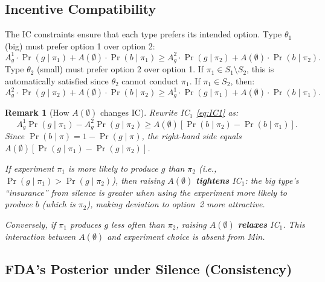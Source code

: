 \documentclass[12pt,a4paper]{article}
\newtheorem{remark}{Remark}
\begin{document}
\subsection{Incentive Compatibility}
\label{sec:ic}

The IC constraints ensure that each type prefers its intended
option. Type $\theta_1$ (big) must prefer option 1 over
option 2:
\begin{equation}\label{eq:IC1}
  A_g^1 \cdot \Pr(g \mid \pi_1)
    + A(\emptyset) \cdot \Pr(b \mid \pi_1)
  \geq
  A_g^2 \cdot \Pr(g \mid \pi_2)
    + A(\emptyset) \cdot \Pr(b \mid \pi_2).
\end{equation}
Type $\theta_2$ (small) must prefer option 2 over option 1.
If $\pi_1 \in S_1 \setminus S_2$, this is automatically
satisfied since $\theta_2$ cannot conduct $\pi_1$. If
$\pi_1 \in S_2$, then:
\begin{equation}\label{eq:IC2}
  A_g^2 \cdot \Pr(g \mid \pi_2)
    + A(\emptyset) \cdot \Pr(b \mid \pi_2)
  \geq
  A_g^1 \cdot \Pr(g \mid \pi_1)
    + A(\emptyset) \cdot \Pr(b \mid \pi_1).
\end{equation}

\begin{remark}[How $A(\emptyset)$ changes IC]
Rewrite IC$_1$ \eqref{eq:IC1} as:
\[
  A_g^1 \Pr(g \mid \pi_1) - A_g^2 \Pr(g \mid \pi_2)
  \geq A(\emptyset)
    \left[\Pr(b \mid \pi_2) - \Pr(b \mid \pi_1)\right].
\]
Since $\Pr(b \mid \pi) = 1 - \Pr(g \mid \pi)$, the
right-hand side equals
$A(\emptyset)[\Pr(g \mid \pi_1) - \Pr(g \mid \pi_2)]$.

If experiment $\pi_1$ is more likely to produce $g$ than
$\pi_2$ (i.e., $\Pr(g \mid \pi_1) > \Pr(g \mid \pi_2)$),
then raising $A(\emptyset)$ \textbf{tightens} IC$_1$: the big
type's ``insurance'' from silence is greater when using the
experiment more likely to produce $b$ (which is $\pi_2$),
making deviation to option~2 more attractive.

Conversely, if $\pi_1$ produces $g$ less often than $\pi_2$,
raising $A(\emptyset)$ \textbf{relaxes} IC$_1$. This
interaction between $A(\emptyset)$ and experiment choice is
absent from Min.
\end{remark}


\subsection{FDA's Posterior under Silence (Consistency)}
\label{sec:consistency}
\end{document}
